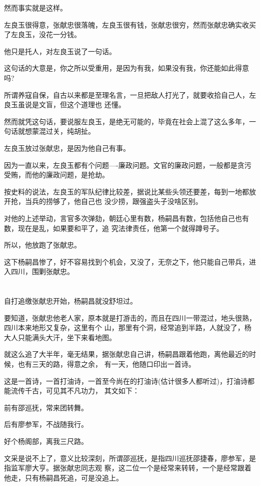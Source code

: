 \documentclass[11pt,a4paper,onecolumn]{article}
\begin{document}
然而事实就是这样。

左良玉很得意，张献忠很落魄，左良玉很有钱，张献忠很穷，然而张献忠确实收买了左良玉，没花一分钱。

他只是托人，对左良玉说了一句话。

这句话的大意是，你之所以受重用，是因为有我，如果没有我，你还能如此得意吗?

所谓养寇自保，自古以来都是至理名言，一旦把敌人打光了，就要收拾自己人，左良玉虽说是文盲，但这个道理也
还懂。

然而就凭这句话，要说服左良玉，是绝无可能的，毕竟在社会上混了这么多年，一句话就想蒙混过关，纯胡扯。

左良玉放过张献忠，是因为他自己有事。

因为一直以来，左良玉都有个问题----廉政问题。文官的廉政问题，一般都是贪污受贿，而他的廉政问题，是抢劫。

按史料的说法，左良玉的军队纪律比较差，据说比某些头领还要差，每到一地都放开抢，当兵的捞够了，他自己也
没少捞，跟强盗头子没啥区别。

对他的上述举动，言官多次弹劾，朝廷心里有数，杨嗣昌有数，包括他自己也有数，现在是乱，如果要和平了，追
究法律责任，他第一个就得蹲号子。

所以，他放跑了张献忠。

这下杨嗣昌惨了，好不容易找到个机会，又没了，无奈之下，他只能自己带兵，进入四川，围剿张献忠。

\section[\thesection]{}

自打追缴张献忠开始，杨嗣昌就没舒坦过。

要知道，张献忠他老人家，原本就是打游击的，而且在四川一带混过，地头很熟，四川本来地形又复杂，这里有个
山，那里有个洞，经常追到半路，人就没了，杨大人只能满头大汗，坐下来看地图。

就这么追了大半年，毫无结果，据张献忠自己讲，杨嗣昌跟着他跑，离他最近的时候，也有三天的路，得意之余，
有一天，他随口印出一首诗。

这是一首诗，一首打油诗，一首至今尚在的打油诗(估计很多人都听过)，打油诗都能流传千古，可见其不凡功力，
其文如下：

前有邵巡抚，常来团转舞。

后有廖参军，不战随我行。

好个杨阁部，离我三尺路。

文采是说不上了，意义比较深刻，所谓邵巡抚，是指四川巡抚邵捷春，廖参军，是指监军廖大亨。据张献忠同志观
察，这二位一个是经常来转转，一个是经常跟着他走，只有杨嗣昌死追，可是没追上。
\end{document}
